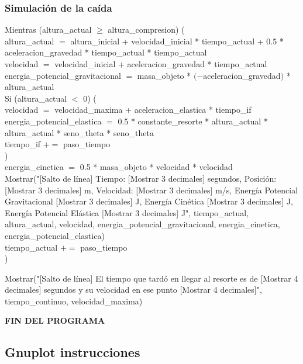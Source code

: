 \documentclass{article}
\begin{document}
\subsubsection*{Simulación de la caída}
Mientras (altura\_actual $\geq$ altura\_compresion) (\\
    altura\_actual $=$ altura\_inicial + velocidad\_inicial * tiempo\_actual + 0.5 * aceleracion\_gravedad * tiempo\_actual * tiempo\_actual \\
    velocidad $=$ velocidad\_inicial + aceleracion\_gravedad * tiempo\_actual \\
    energia\_potencial\_gravitacional $=$ masa\_objeto * $(-$aceleracion\_gravedad$)$ * altura\_actual \\
    Si (altura\_actual $<$ 0) (\\
        velocidad $=$ velocidad\_maxima + aceleracion\_elastica * tiempo\_if \\
        energia\_potencial\_elastica $=$ 0.5 * constante\_resorte * altura\_actual * altura\_actual * seno\_theta * seno\_theta \\
        tiempo\_if $+=$ paso\_tiempo \\
    ) \\
    energia\_cinetica $=$ 0.5 * masa\_objeto * velocidad * velocidad \\
    Mostrar("[Salto de línea] Tiempo: [Mostrar 3 decimales] segundos, Posición: [Mostrar 3 decimales] m, Velocidad: [Mostrar 3 decimales] m/s, Energía Potencial Gravitacional [Mostrar 3 decimales] J, Energía Cinética [Mostrar 3 decimales] J, Energía Potencial Elástica [Mostrar 3 decimales] J", tiempo\_actual, altura\_actual, velocidad, energia\_potencial\_gravitacional, energia\_cinetica, energia\_potencial\_elastica) \\
    tiempo\_actual $+=$ paso\_tiempo \\
)


Mostrar("[Salto de línea] El tiempo que tardó en llegar al resorte es de [Mostrar 4 decimales] segundos y su velocidad en ese punto [Mostrar 4 decimales]", tiempo\_continuo, velocidad\_maxima)

\textbf{FIN DEL PROGRAMA}

\subsection{Gnuplot instrucciones}
\end{document}
